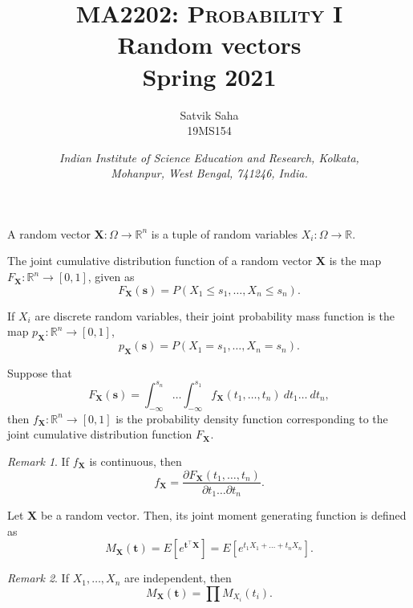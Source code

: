 \documentclass[11pt]{article}
\title{
    \Large\textsc{MA2202: Probability I} \\
    \Huge \textbf{Random vectors} \\
    \vspace{5pt}
    \Large{Spring 2021}
}
\author{
    \large Satvik Saha%
    \\\textsc{\small 19MS154}
}
\date{\normalsize
    \textit{Indian Institute of Science Education and Research, Kolkata, \\
    Mohanpur, West Bengal, 741246, India.} \\
}
\def\R{\mathbb{R}}
\newcommand\E[1]{E\left[#1\right]}
\renewcommand\vec[1]{\boldsymbol{#1}}
\def\vX{\vec{X}}
\def\vt{\vec{t}}
\theoremstyle{definition}
\theoremstyle{remark}
\newtheorem*{remark}{Remark}
\numberwithin{equation}{module}
\begin{document}
    \maketitle

    \begin{definition}
        A random vector $\vX\colon \Omega \to \R^n$ is a tuple of random 
        variables $X_i\colon \Omega \to \R$.
    \end{definition}
    \begin{definition}
        The joint cumulative distribution function of a random vector $\vX$ is
        the map $F_{\vX}\colon \R^n \to [0, 1]$, given as \[
            F_{\vX}(\vec{s}) = P(X_1 \leq s_1, \dots, X_n \leq s_n).
        \] 
    \end{definition}

    \begin{definition}
        If $X_i$ are discrete random variables, their joint probability mass 
        function is the map $p_{\vX} \colon \R^n \to [0, 1]$, \[
            p_{\vX}(\vec{s}) = P(X_1 = s_1, \dots, X_n = s_n).
        \] 
    \end{definition}

    \begin{definition}
        Suppose that \[
            F_{\vX}(\vec{s}) = \int_{-\infty}^{s_n} \dots \int_{-\infty}^{s_1}
            f_{\vX}(t_1, \dots, t_n)\:dt_1\dots\:dt_n,
        \] then $f_{\vX}\colon \R^n \to [0, 1]$ is the probability density
        function corresponding to the joint cumulative distribution function
        $F_{\vX}$.

        \begin{remark}
            If $f_{\vX}$ is continuous, then \[
                f_{\vX} = \frac{\partial F_{\vX}(t_1, \dots, t_n)}{\partial
                t_1\dots\partial t_n}.
            \] 
        \end{remark}
    \end{definition}

    \begin{definition}
        Let $\vX$ be a random vector. Then, its joint moment generating function
        is defined as \[
            M_{\vX}(\vt) = \E{e^{\vt^\top \vX}} = \E{e^{t_1X_1 +
            \dots + t_nX_n}}.
        \] 
        \begin{remark}
            If $X_1, \dots, X_n$ are independent, then \[
                M_{\vX}(\vt) = \prod M_{X_i}(t_i).
            \] 
        \end{remark} 
    \end{definition}
    
\end{document}
